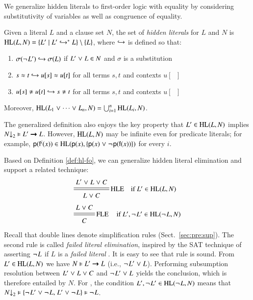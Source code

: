 We generalize hidden literals to first-order logic with equality by
considering substitutivity of variables as well as congruence of equality.

\begin{defi}
\label{def:hl-fo}
Given a literal $L$ and a clause set $N$,
the set of \emph{hidden literals} for $L$ and $N$
is $\HL(L,N) = \{ L' \mid L' \bigfimpl{N}^\ast L \} \setminus \{ L \}$, where
$\bigfimpl{N}$ is defined so that:
\begin{enumerate}
    \item $\sigmaterm{\neglit{L'}} \bigfimpl{N} \sigmaterm{L}$ if
    $L' \cor L \in N$ and $\sigma$ is a substitution
    \item $\eqlit{s}{t} \bigfimpl{N} \eqlit{u[s]}{u[t]}$ for all terms $s, t$ and
    contexts $u[\phantom{\cdot}]$
    \item $\neqlit{u[s]}{u[t]} \bigfimpl{N} \neqlit{s}{t}$ for all terms $s, t$ and
    contexts $u[\phantom{\cdot}]$
\end{enumerate}
Moreover, $\HL(L_1 \cor \cdots \cor L_n, N) = \bigcup_{i=1}^n \HL(L_i, N)$.
\end{defi}

The generalized definition also enjoys the key property that $L'
\in \HL(L, N)$ implies $\binset{N} \models L' \impl L$. However, $\HL(L, N)$
may be infinite even for predicate literals; for example,
$\pospredlit{\cst{p}(\cst{f}^i(x))} \in \HL(\pospredlit{\cst{p}(x)}, \{\pospredlit{\cst{p}(x)} \cor
\negpredlit{\cst{p}(\cst{f}(x))} \})$ for every $i$.

Based on Definition \ref{def:hl-fo}, we can generalize hidden literal elimination
and support a related technique:
\begin{align*}
    & \namedsimpsc{HLE}{L' \cor L \cor C}{L \cor C}{L' \in \HL(L,N)} \\[.5\jot]
    & \namedsimpsc{\rlap{FLE}\phantom{HLE}}{L \cor C}{C}{L',\neglit{L'} \in \HL(\neglit{L}, N)}
 \end{align*}
Recall that double lines denote simplification rules (Sect.~\ref{sec:pre:sup}).
The second rule is called \textit{failed literal elimination},
inspired by the SAT technique of asserting $\neglit{L}$ if $L$ is a \textit{failed literal} \cite{jwf-1995-fld}.
It is easy to see that rule  is sound.
From $L' \in \HL(L,N)$ we have $N \models L' \impl L$ (i.e., $\neglit{L'} \cor L$).
Performing subsumption resolution \cite{bg-01-resolution} between $L'
\cor L \cor C$ and $\neglit{L'} \cor L$ yields the conclusion, which is
therefore entailed by $N.$ For , the condition $L',
\neglit{L'} \in \HL(\neglit{L},N)$ means that $\binset{N} \models \{\neglit{L'} \cor
\neglit{L}{,}\; L' \cor \neglit{L}\} \models \neglit{L}$.


